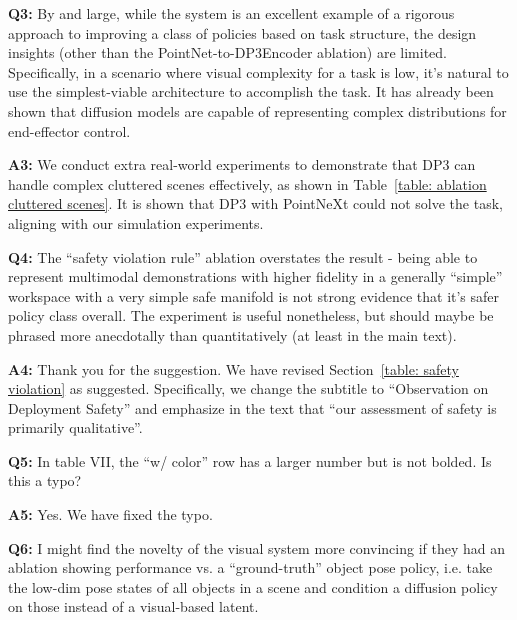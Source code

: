 \vspace{0.1in}

\noindent\textbf{Q3:} By and large, while the system is an excellent example of a rigorous approach to improving a class of policies based on task structure, the design insights (other than the PointNet-to-DP3Encoder ablation) are limited. Specifically, in a scenario where visual complexity for a task is low, it’s natural to use the simplest-viable architecture to accomplish the task. It has already been shown that diffusion models are capable of representing complex distributions for end-effector control.

\noindent\textbf{A3:} We conduct extra real-world experiments to demonstrate that DP3 can handle complex cluttered scenes effectively, as shown in Table~\ref{table: ablation cluttered scenes}. It is shown that DP3 with PointNeXt could not solve the task, aligning with our simulation experiments.

\vspace{0.1in}


\noindent\textbf{Q4:} The “safety violation rule” ablation overstates the result - being able to represent multimodal demonstrations with higher fidelity in a generally “simple” workspace with a very simple safe manifold is not strong evidence that it’s safer policy class overall. The experiment is useful nonetheless, but should maybe be phrased more anecdotally than quantitatively (at least in the main text). 

\noindent\textbf{A4:} Thank you for the suggestion. We have revised Section~\ref{table: safety violation} as suggested. Specifically, we change the subtitle to “Observation on Deployment Safety” and emphasize in the text that “our assessment of safety is primarily qualitative”.


\vspace{0.1in}

\noindent\textbf{Q5:} In table VII, the “w/ color” row has a larger number but is not bolded. Is this a typo?

\noindent\textbf{A5:} Yes. We have fixed the typo.

\vspace{0.1in}


\noindent\textbf{Q6:} I might find the novelty of the visual system more convincing if they had an ablation showing performance vs. a “ground-truth” object pose policy, i.e. take the low-dim pose states of all objects in a scene and condition a diffusion policy on those instead of a visual-based latent.

